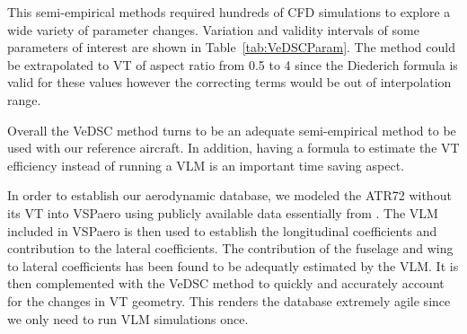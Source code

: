 This semi-empirical methods required hundreds of CFD simulations to explore a wide variety of parameter changes. Variation and validity intervals of some parameters of interest are shown in Table~\ref{tab:VeDSCParam}. The method could be extrapolated to VT of aspect ratio from 0.5 to 4 since the Diederich formula is valid for these values however the correcting terms would be out of interpolation range.

Overall the VeDSC method turns to be an adequate semi-empirical method to be used with our reference aircraft. In addition, having a formula to estimate the VT efficiency instead of running a VLM is an important time saving aspect.

In order to establish our aerodynamic database, we modeled the ATR72 without its VT into VSPaero using publicly available data essentially from \cite{JanesAircraft}. The VLM included in VSPaero is then used to establish the longitudinal coefficients and contribution to the lateral coefficients. The contribution of the fuselage and wing to lateral coefficients has been found to be adequatly estimated by the VLM. It is then complemented with the VeDSC method to quickly and accurately account for the changes in VT geometry. This renders the database extremely agile since we only need to run VLM simulations once.

